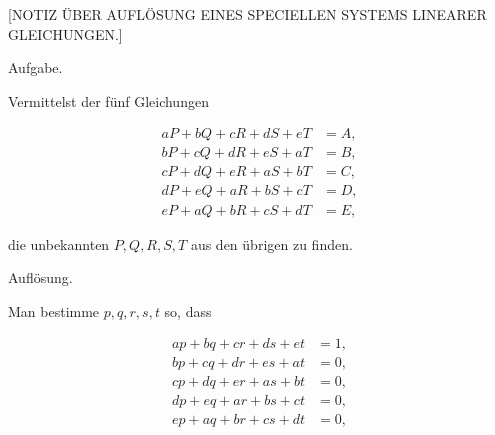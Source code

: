 \clearpage
{}

\begin{center}
\large [NOTIZ ÜBER AUFLÖSUNG EINES SPECIELLEN SYSTEMS
LINEARER GLEICHUNGEN.]
\end{center}

\begin{center}
Aufgabe.
\end{center}

\noindent\hspace*{\parindent}Vermittelst der fünf Gleichungen

\[
\begin{aligned}
aP + bQ + cR + dS + eT &= A,\\[3pt]
bP + cQ + dR + eS + aT &= B,\\[3pt]
cP + dQ + eR + aS + bT &= C,\\[3pt]
dP + eQ + aR + bS + cT &= D,\\[3pt]
eP + aQ + bR + cS + dT &= E,
\end{aligned}
\]

\noindent die unbekannten $P, Q, R, S, T$ aus den übrigen zu finden.

\begin{center}
Auflösung.
\end{center}

\noindent\hspace*{\parindent}Man bestimme $p, q, r, s, t$ so, dass

\[
\begin{aligned}
ap + bq + cr + ds + et &= 1,\\[3pt]
bp + cq + dr + es + at &= 0,\\[3pt]
cp + dq + er + as + bt &= 0,\\[3pt]
dp + eq + ar + bs + ct &= 0,\\[3pt]
ep + aq + br + cs + dt &= 0,
\end{aligned}
\]

